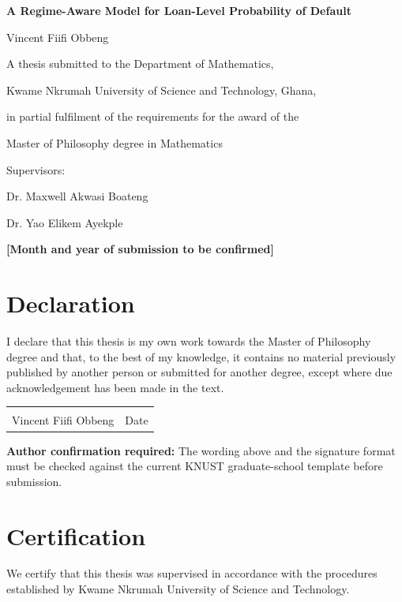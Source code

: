 \begin{titlepage}
\centering
\vspace*{1.2cm}
{\Large\bfseries A Regime-Aware Model for Loan-Level Probability of Default\par}
\vspace{2.0cm}
{\large Vincent Fiifi Obbeng\par}
\vspace{1.5cm}
{\large A thesis submitted to the Department of Mathematics,\par
Kwame Nkrumah University of Science and Technology, Ghana,\par
in partial fulfilment of the requirements for the award of the\par
Master of Philosophy degree in Mathematics\par}
\vfill
{\large Supervisors:\par
Dr. Maxwell Akwasi Boateng\par
Dr. Yao Elikem Ayekple\par}
\vfill
{\large \textbf{[Month and year of submission to be confirmed]}\par}
\end{titlepage}

\clearpage
{}
\hypersetup{pageanchor=true}
\setcounter{page}{1}
\onehalfspacing

\chapter*{Declaration}
I declare that this thesis is my own work towards the Master of Philosophy degree and that, to the best of my knowledge, it contains no material previously published by another person or submitted for another degree, except where due acknowledgement has been made in the text.

\vspace{2.0cm}
\noindent\begin{tabular}{p{}p{}}
\hrulefill & \hrulefill\\
Vincent Fiifi Obbeng & Date\\[1.8cm]
\end{tabular}

\noindent\textbf{Author confirmation required:} The wording above and the signature format must be checked against the current KNUST graduate-school template before submission.

\clearpage
\chapter*{Certification}
We certify that this thesis was supervised in accordance with the procedures established by Kwame Nkrumah University of Science and Technology.

